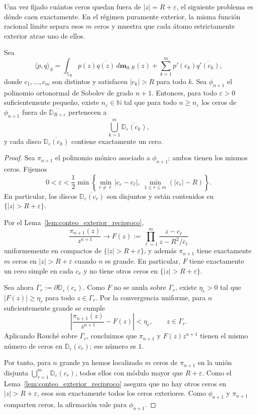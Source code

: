 Una vez fijado cuántos ceros quedan fuera de $|z|=R+\varepsilon$, el siguiente problema es dónde caen exactamente. En el régimen puramente exterior, la misma función racional límite separa esos $m$ ceros y muestra que cada átomo estrictamente exterior atrae uno de ellos.

\begin{thm}\label{thm:atraccion}
	Sea
	\[
		\langle p,q\rangle_S
		=
		\int_{\mathbb S_R}p(z)\overline{q(z)}\,d\mathbf m_{0;R}(z)
		+
		\sum_{k=1}^m p'(c_k)\overline{q'(c_k)},
	\]
	donde $c_1,\dots,c_m$ son distintos y satisfacen $|c_k|>R$ para todo $k$.
	Sea $\phi_{n+1}$ el polinomio ortonormal de Sobolev de grado $n+1$.
	Entonces, para todo $\varepsilon>0$ suficientemente pequeño, existe $n_\varepsilon\in\mathbb N$ tal que para todo $n\ge n_\varepsilon$ los ceros de $\phi_{n+1}$ fuera de $\overline{\mathbb D_{R+\varepsilon}}$ pertenecen a
	\[
		\bigcup_{k=1}^m\overline{\mathbb D_\varepsilon(c_k)},
	\]
	y cada disco $\overline{\mathbb D_\varepsilon(c_k)}$ contiene exactamente un cero.
\end{thm}

\begin{proof}
	Sea $\pi_{n+1}$ el polinomio mónico asociado a $\phi_{n+1}$; ambos tienen los mismos ceros. Fijemos
	\[
		0<\varepsilon<\frac12\min\left\{\min_{r\ne \ell}|c_r-c_\ell|,\ \min_{1\le r\le m}(|c_r|-R)\right\}.
	\]
	En particular, los discos $\overline{\mathbb D_\varepsilon(c_r)}$ son disjuntos y están contenidos en $\{|z|>R+\varepsilon\}$.

	Por el Lema~\ref{lem:conteo_exterior_reciproco},
	\[
		\frac{\pi_{n+1}(z)}{z^{n+1}}
		\longrightarrow
		F(z):=\prod_{\ell=1}^m\frac{z-c_\ell}{z-R^2/\overline c_\ell}
	\]
	uniformemente en compactos de $\{|z|>R+\varepsilon\}$, y además $\pi_{n+1}$ tiene exactamente $m$ ceros en $|z|>R+\varepsilon$ cuando $n$ es grande. En particular, $F$ tiene exactamente un cero simple en cada $c_r$ y no tiene otros ceros en $\{|z|>R+\varepsilon\}$.

	Sea ahora $\Gamma_r:=\partial\mathbb D_\varepsilon(c_r)$. Como $F$ no se anula sobre $\Gamma_r$, existe $\eta_r>0$ tal que $|F(z)|\ge\eta_r$ para todo $z\in\Gamma_r$. Por la convergencia uniforme, para $n$ suficientemente grande se cumple
	\[
		\left|\frac{\pi_{n+1}(z)}{z^{n+1}}-F(z)\right|<\eta_r,
		\qquad z\in\Gamma_r.
	\]
	Aplicando Rouché sobre $\Gamma_r$, concluimos que $\pi_{n+1}$ y $F(z)z^{n+1}$ tienen el mismo número de ceros en $\mathbb D_\varepsilon(c_r)$; ese número es $1$.

	Por tanto, para $n$ grande ya hemos localizado $m$ ceros de $\pi_{n+1}$ en la unión disjunta $\bigcup_{r=1}^m\mathbb D_\varepsilon(c_r)$, todos ellos con módulo mayor que $R+\varepsilon$. Como el Lema~\ref{lem:conteo_exterior_reciproco} asegura que no hay otros ceros en $|z|>R+\varepsilon$, esos son exactamente todos los ceros exteriores. Como $\phi_{n+1}$ y $\pi_{n+1}$ comparten ceros, la afirmación vale para $\phi_{n+1}$.
\end{proof}

